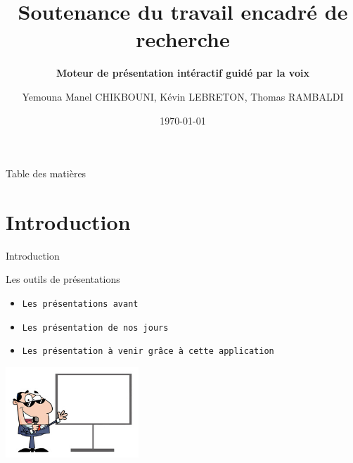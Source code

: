 \documentclass[10pt]{beamer}
\title[] %
{ %
      \textbf{Soutenance du travail encadré de recherche}
}
\subtitle[Moteur de présentation intéractif guidé par la voix]
{
	\textbf{Moteur de présentation intéractif guidé par la voix}
}
\author[Yemouna Manel CHIKBOUNI, Kévin LEBRETON, Thomas RAMBALDI]
{      Yemouna Manel CHIKBOUNI, Kévin LEBRETON, Thomas RAMBALDI
}
\institute[]
{
	Faculté des sciences de Luminy\\
	Université d'Aix-Marseille\\
	Master 1 informatique\\
  
}
\date{\today}
\begin{document}

{\1%
\begin{frame}
  \titlepage %
\end{frame}


\begin{frame}{Table des matières}
	\tableofcontents
\end{frame}
}

\section{Introduction}
\begin{frame}{Introduction}
	\begin{block}{Les outils de présentations}	
		\begin{itemize}
			\item {\tt Les présentations avant}
			\item {\tt Les présentation de nos jours}
			\item {\tt Les présentation à venir grâce à cette application}
		\end{itemize}
	\end{block}
	\centering \includegraphics[width=5cm]{./images/presentation_voix}
\end{frame}
\end{document}
